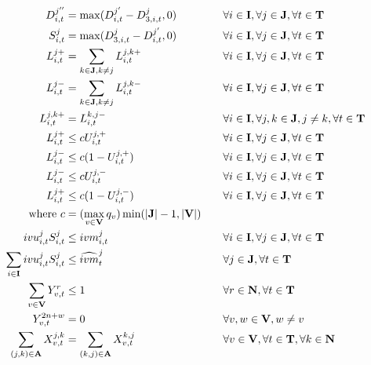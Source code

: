 \documentclass[12pt,a4paper]{article}
\begin{document}
\begin{align}
D_{i,t}^{j{''}} & = \max(D_{i,t}^{j{'}}-D_{3,i,t}^{j},0) && \quad \forall i\in \textbf{I},\forall j\in \textbf{J}, \forall t \in \textbf{T} \label{eq:max3}\\
S_{i,t}^{j} & = \max(D_{3,i,t}^{j}-D_{i,t}^{j{'}},0) && \quad \forall i\in \textbf{I},\forall j\in \textbf{J}, \forall t \in \textbf{T} \label{eq:max4}\\
L_{i,t}^{j{+}} & = \sum_{k\in \textbf{J},k\neq j}L_{i,t}^{j,k{+}} && \quad \forall i\in \textbf{I},\forall j\in \textbf{J}, \forall t \in \textbf{T} \label{eq:Fig2_1}\\
L_{i,t}^{j{-}} & = \sum_{k\in \textbf{J},k\neq j}L_{i,t}^{j,k{-}} && \quad \forall i\in \textbf{I},\forall j\in \textbf{J}, \forall t \in \bf{T} \label{eq:Fig2_2}\\
L_{i,t}^{j,k{+}} & = L_{i,t}^{k,j{-}} && \quad \forall i\in \textbf{I},\forall j,k\in \textbf{J}, j\neq k, \forall t \in \textbf{T}\\
L_{i,t}^{j{+}} & \leq c U_{i,t}^{j,{+}} && \quad \forall i\in \textbf{I},\forall j\in \textbf{J}, \forall t \in \textbf{T}\\
L_{i,t}^{j{-}} & \leq c (1-U_{i,t}^{j,{+}}) && \quad \forall i\in \textbf{I},\forall j\in \textbf{J}, \forall t \in \textbf{T}\\
L_{i,t}^{j{-}} & \leq c U_{i,t}^{j,{-}} && \quad \forall i\in \textbf{I},\forall j\in \textbf{J}, \forall t \in \textbf{T}\\
L_{i,t}^{j{+}} & \leq c (1-U_{i,t}^{j,{-}}) && \quad \forall i\in \textbf{I},\forall j\in \textbf{J}, \forall t \in \textbf{T}\\
\text{where } c & = (\max_{v\in \textbf{V}} q_v)\min(|\textbf{J}|-1,|\textbf{V}|) && \nonumber \\
ivu_{i,t}^{j} S_{i,t}^{j} & \leq ivm_{i,t}^{j} && \quad \forall i\in \textbf{I},\forall j\in \textbf{J}, \forall t \in \textbf{T}  \\
\sum_{i \in \textbf{I}} ivu_{i,t}^{j} S_{i,t}^{j} & \leq \widehat{ivm}_{t}^{j} && \quad \forall j\in \textbf{J}, \forall t \in \textbf{T} \\
\sum_{v\in \textbf{V}} Y_{v,t}^{r} & \leq 1 && \quad \forall r \in \textbf{N}, \forall t \in \textbf{T} \\
Y_{v,t}^{2n+w} & = 0 && \quad \forall v,w \in \textbf{V}, w \neq v \\
\sum_{(j,k)\in \textbf{A}} X_{v,t}^{j,k} & = \sum_{(k,j)\in \textbf{A}} X_{v,t}^{k,j} && \quad \forall v \in \textbf{V}, \forall t \in \textbf{T}, \forall k \in \textbf{N} \\

\end{align}
\end{document}
